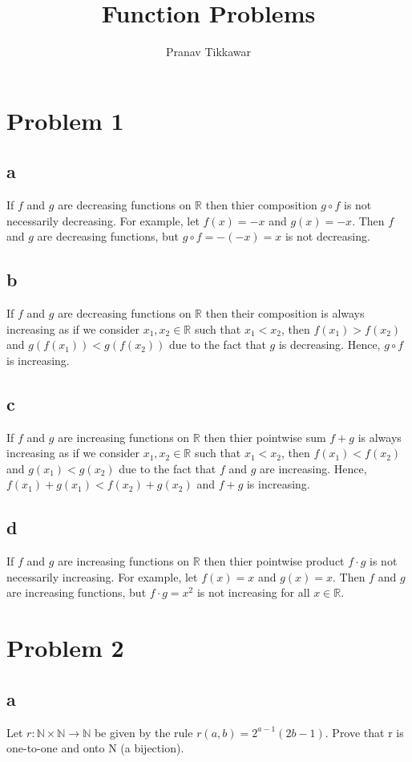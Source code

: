 \documentclass{article}
\author{Pranav Tikkawar}
\title{Function Problems}
\begin{document}
\maketitle
\section*{Problem 1}
\subsection*{a}
If $f$ and $g$ are decreasing functions on $\mathbb{R}$ then thier composition $g \circ f$ is not necessarily decreasing. For example, let $f(x) = -x$ and $g(x) = -x$. Then $f$ and $g$ are decreasing functions, but $g \circ f = -(-x) = x$ is not decreasing.
\subsection*{b}
If $f$ and $g$ are decreasing functions on $\mathbb{R}$ then their composition is always increasing as if we consider $x_1, x_2 \in \mathbb{R}$ such that $x_1 < x_2$, then $f(x_1) > f(x_2)$ and $g(f(x_1)) < g(f(x_2))$ due to the fact that $g$ is decreasing. Hence, $g \circ f$ is increasing.
\subsection*{c} 
If $f$ and $g$ are increasing functions on $\mathbb{R}$ then thier pointwise sum $f+g$ is always increasing as if we consider $x_1, x_2 \in \mathbb{R}$ such that $x_1 < x_2$, then $f(x_1) < f(x_2)$ and $g(x_1) < g(x_2)$ due to the fact that $f$ and $g$ are increasing. Hence, $f(x_1) + g(x_1) < f(x_2) + g(x_2)$ and $f+g$ is increasing. 
\subsection*{d}
If $f$ and $g$ are increasing functions on $\mathbb{R}$ then thier pointwise product $f \cdot g$ is not necessarily increasing. For example, let $f(x) = x$ and $g(x) = x$. Then $f$ and $g$ are increasing functions, but $f \cdot g = x^2$ is not increasing for all $x \in \mathbb{R}$.
\section*{Problem 2}
\subsection*{a}
Let $r: \mathbb{N} \times \mathbb{N} \rightarrow \mathbb{N}$ be given by the rule $r(a,b) = 2^{a-1}(2b-1)$. Prove that r is one-to-one and onto N (a bijection).
\end{document}
